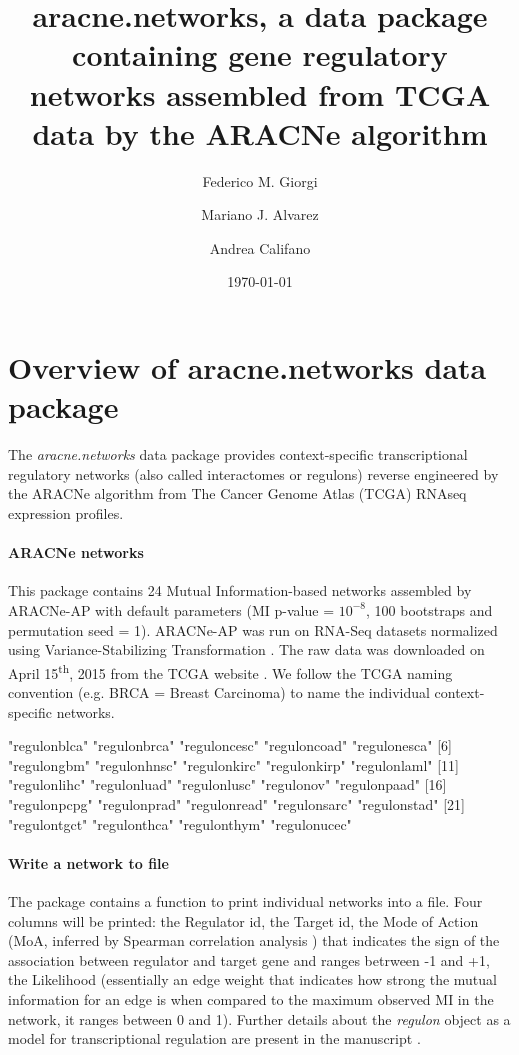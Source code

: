 \documentclass{article}
\title{aracne.networks, a data package containing gene regulatory networks assembled from TCGA data by the ARACNe algorithm}
\author[1,2]{Federico M. Giorgi}
\author[1,3]{Mariano J. Alvarez}
\author[1]{Andrea Califano}
\affil[1]{Department of Systems Biology, Columbia University, New York, USA}
\affil[2]{CRUK, Cambridge University, Cambridge, UK}
\affil[3]{DarwinHealth Inc., New York, USA}
\date{\today}
\begin{document}

\maketitle




\section{Overview of aracne.networks data package}\label{sec:overview}
The \emph{aracne.networks} data package provides context-specific transcriptional regulatory networks (also called interactomes or regulons) reverse engineered by the ARACNe algorithm from The Cancer Genome Atlas (TCGA) RNAseq expression profiles.

\paragraph{ARACNe networks}
This package contains 24 Mutual Information-based networks assembled by ARACNe-AP \cite{Giorgi2016} with default parameters (MI p-value = $10^{-8}$, 100 bootstraps and  permutation seed = 1).
ARACNe-AP was run on RNA-Seq datasets normalized using Variance-Stabilizing Transformation \cite{Anders2010}.
The raw data was downloaded on April 15\textsuperscript{th}, 2015 from the TCGA website \cite{Weinstein2013}.
We follow the TCGA naming convention (e.g. BRCA = Breast Carcinoma) to name the individual context-specific networks.

\begin{Schunk}
\begin{Soutput}
 [1] "regulonblca" "regulonbrca" "reguloncesc" "reguloncoad" "regulonesca"
 [6] "regulongbm"  "regulonhnsc" "regulonkirc" "regulonkirp" "regulonlaml"
[11] "regulonlihc" "regulonluad" "regulonlusc" "regulonov"   "regulonpaad"
[16] "regulonpcpg" "regulonprad" "regulonread" "regulonsarc" "regulonstad"
[21] "regulontgct" "regulonthca" "regulonthym" "regulonucec"
\end{Soutput}
\end{Schunk}

\paragraph{Write a network to file}
The package contains a function to print individual networks into a file.
Four columns will be printed: the Regulator id, the Target id, the Mode of Action (MoA, inferred by Spearman correlation analysis \cite{Alvarez2016}) that indicates the sign of the association between regulator and target gene and ranges betrween -1 and +1, the Likelihood (essentially an edge weight that indicates how strong the mutual information for an edge is when compared to the maximum observed MI in the network, it ranges between 0 and 1). Further details about the \emph{regulon} object as a model for transcriptional regulation are present in the manuscript \cite{Alvarez2016}.
\end{document}
